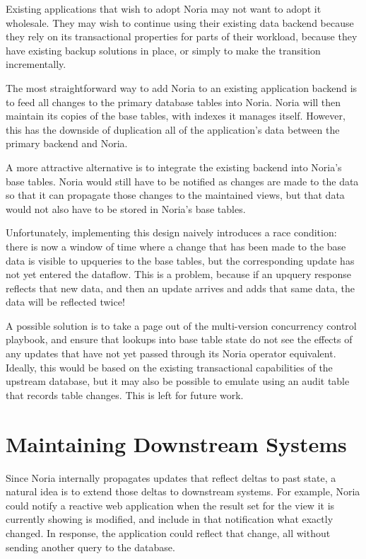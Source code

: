 Existing applications that wish to adopt Noria may not want to adopt it
wholesale. They may wish to continue using their existing data backend because
they rely on its transactional properties for parts of their workload, because
they have existing backup solutions in place, or simply to make the transition
incrementally.

The most straightforward way to add Noria to an existing application backend is
to feed all changes to the primary database tables into Noria. Noria will then
maintain its copies of the base tables, with indexes it manages itself. However,
this has the downside of duplication all of the application's data between the
primary backend and Noria.

A more attractive alternative is to integrate the existing backend into Noria's
base tables. Noria would still have to be notified as changes are made to the
data so that it can propagate those changes to the maintained views, but that
data would not also have to be stored in Noria's base tables.

Unfortunately, implementing this design naively introduces a race condition:
there is now a window of time where a change that has been made to the base data
is visible to upqueries to the base tables, but the corresponding update has not
yet entered the dataflow. This is a problem, because if an upquery response
reflects that new data, and then an update arrives and adds that same data, the
data will be reflected twice!

A possible solution is to take a page out of the multi-version concurrency
control playbook, and ensure that lookups into base table state do not see the
effects of any updates that have not yet passed through its Noria operator
equivalent. Ideally, this would be based on the existing transactional
capabilities of the upstream database, but it may also be possible to emulate
using an audit table that records table changes. This is left for future work.

\section{Maintaining Downstream Systems}

Since Noria internally propagates updates that reflect deltas to past state, a
natural idea is to extend those deltas to downstream systems. For example, Noria
could notify a reactive web application when the result set for the view it is
currently showing is modified, and include in that notification what exactly
changed. In response, the application could reflect that change, all without
sending another query to the database.


